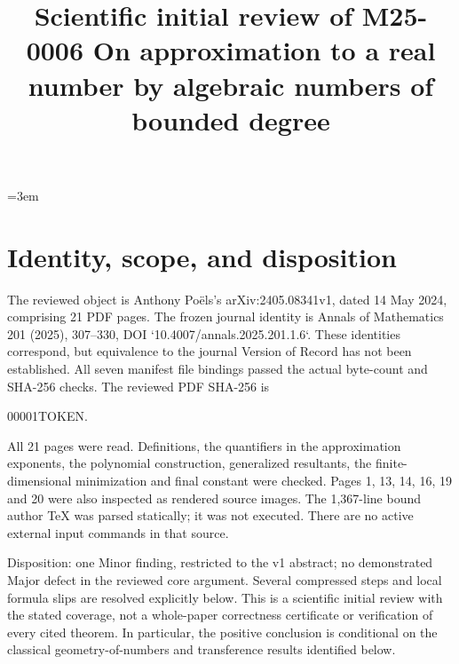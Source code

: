 \documentclass[10pt]{article}
\title{Scientific initial review of M25-0006
On approximation to a real number by algebraic numbers of bounded degree}
\author{}
\date{}
\begin{document}
\maketitle
=3em\par
\section*{Identity, scope, and disposition}
The reviewed object is Anthony Poëls’s arXiv:2405.08341v1, dated 14 May 2024, comprising 21 PDF pages. The frozen journal identity is Annals of Mathematics 201 (2025), 307–330, DOI `10.4007/annals.2025.201.1.6`. These identities correspond, but equivalence to the journal Version of Record has not been established. All seven manifest file bindings passed the actual byte-count and SHA-256 checks. The reviewed PDF SHA-256 is\par
00001TOKEN.\par
All 21 pages were read. Definitions, the quantifiers in the approximation exponents, the polynomial construction, generalized resultants, the finite-dimensional minimization and final constant were checked. Pages 1, 13, 14, 16, 19 and 20 were also inspected as rendered source images. The 1,367-line bound author TeX was parsed statically; it was not executed. There are no active external input commands in that source.\par
Disposition: one Minor finding, restricted to the v1 abstract; no demonstrated Major defect in the reviewed core argument. Several compressed steps and local formula slips are resolved explicitly below. This is a scientific initial review with the stated coverage, not a whole-paper correctness certificate or verification of every cited theorem. In particular, the positive conclusion is conditional on the classical geometry-of-numbers and transference results identified below.\par
\end{document}

